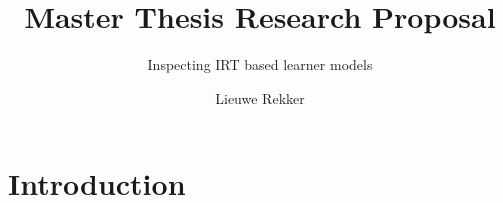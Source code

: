 \documentclass{scrartcl}
\providecommand{\comm}[1]{{\bf[ #1 ]}}
\providecommand{\commd}[1]{\comm{D: {#1}}}
\begin{document}
\title{Master Thesis Research Proposal}
\subtitle{Inspecting IRT based learner models}
\author{Lieuwe Rekker}
\maketitle
\nocite{labelcombi}
\nocite{lftransfer}
\nocite{importance}
\nocite{knowledgeproblem}
\nocite{modelreview}
\nocite{eirt}
\nocite{pfa}
\nocite{ktpfa}
\nocite{skillcombi}
\nocite{lfa}
\nocite{blackart}
\nocite{hambleton}


\section{Introduction}
\begin{comment}
Many current intelligent tutor systems (ITS) use learner models that can give indications of to what extent a student has mastered a particular skill and even how fast students learn.  The quality of these models is generally measured by how well these models predict 'one question into the future' performance, which is what these algorithms\commd{You didn't mention any algorithms yet, just models - and even then, they maximimize the likelihood of the training data...} are made to maximize. Parameter values from these models are also inspected and stated to represent students' knowledge levels, how fast students learn, how difficult questions are etc. It would thus be wise to inspect other factors beyond the accuracy of the model to gain some idea of under what conditions they actually convey some stable real world factor or are rather part of a more black-box like model that performs well on its prediction task, but whose parameters are otherwise meaningless. \cite{knowledgeproblem} shows that this is indeed a problem: widely differing parameter settings can yield similar, (near) optimal performances. This proposal proposes research to explore if parameters of learner models hold meaning in real life.

The approach of this research is from the perspective that models resemble reality, but are necessarily not precise mirrors of it. Initially generated data will be used to see how well parameter values can be retrieved at all and to see what happens to parameters when there is a mismatch between model and 'reality' (i.e. training a model on data generated by a different model). The amount of training data will be looked at especially, since even if stable parameter values can be found, this will probably break down at some point. In the case of real data, original parameters and models are unknown. Over multiple training runs on different data-sets, variation in parameter values can be inspected. High variation here indicates that (despite possible good prediction performance of the model as a whole) the parameter does not represent anything in reality.
\end{comment}
\end{document}
